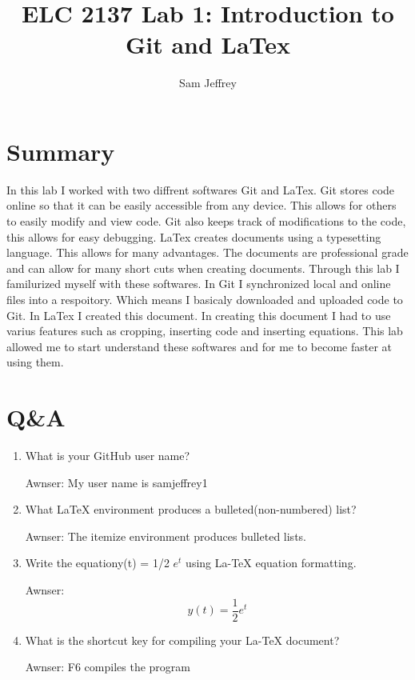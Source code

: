 \documentclass[11pt]{article}
\begin{document}
\title{ELC 2137 Lab 1: Introduction to Git and LaTex}
\author{Sam Jeffrey}

\maketitle


\section*{Summary}

In this lab I worked with two diffrent softwares Git and LaTex. Git stores code online so that it can be easily accessible from any device. This allows for others to easily modify and view code. Git also keeps track of modifications to the code, this allows for easy debugging. LaTex creates documents using a typesetting language. This allows for many advantages. The documents are professional grade and can allow for many short cuts when creating documents. Through this lab I familurized myself with these softwares. In Git I synchronized local and online files into a respoitory. Which means I basicaly downloaded and uploaded code to Git. In LaTex I created this document. In creating this document I had to use varius features such as cropping, inserting code and inserting equations. This lab allowed me to start understand these softwares and for me to become faster at using them. 

\section*{Q\&A}


\begin{enumerate}
\item  What is your GitHub user name?
 
Awnser: My user name is samjeffrey1

\item  What  LaTeX  environment  produces  a  bulleted(non-numbered) list?

Awnser: The itemize environment produces bulleted lists.

\item  Write  the  equationy(t) = 1/2 $e^t$ using  La-TeX equation formatting.

Awnser: 
\begin{equation}
	y(t) = \frac{1}{2}e^t
\end{equation}

\item  What is the shortcut key for compiling your La-TeX document?

Awnser: F6 compiles the program

\end{enumerate}
\end{document}
